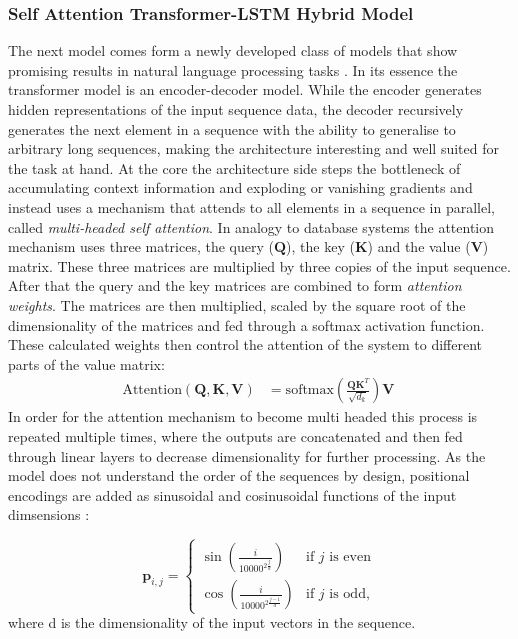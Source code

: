 \documentclass[12pt]{article}
\begin{document}
\subsubsection{Self Attention Transformer-LSTM Hybrid Model}
The next model comes form a newly developed class of models that show promising results in natural language processing tasks  \citep{vaswani2017attention}. In its essence the transformer model is an encoder-decoder model. While the encoder generates hidden representations of the input sequence data, the decoder recursively generates the next element in a sequence with the ability to generalise to arbitrary long sequences, making the architecture interesting and well suited for the task at hand. At the core the architecture side steps the bottleneck of accumulating context information and exploding or vanishing gradients and instead uses a mechanism that attends to all elements in a sequence in parallel, called \textit{multi-headed self attention}. In analogy to database systems the attention mechanism uses three matrices, the query ($\mathbf{Q}$), the key ($\mathbf{K}$) and the value ($\mathbf{V}$) matrix. These three matrices are multiplied by three copies of the input sequence. After that the query and the key matrices are combined to form \textit{attention weights}. The matrices are then multiplied, scaled by the square root of the dimensionality of the matrices and fed through a softmax activation function. These calculated weights then control the attention of the system to different parts of the value matrix:
\begin{equation}
\begin{aligned}
	\text{Attention}(\mathbf{Q}, \mathbf{K}, \mathbf{V}) &= \text{softmax}\left(\frac{\mathbf{Q}\mathbf{K}^T}{\sqrt{d_k}}\right)\mathbf{V} \
\end{aligned}
\end{equation}
In order for the attention mechanism to become multi headed this process is repeated multiple times, where the outputs are concatenated and then fed through linear layers to decrease dimensionality for further processing. As the model does not understand the order of the sequences by design, positional encodings are added as sinusoidal and cosinusoidal functions of the input dimsensions \citep{vaswani2017attention}:

\begin{equation}
	\mathbf{p}_{i,j} =
	\begin{cases}
		\sin\left(\frac{i}{10000^{2 \frac{j}{d}}}\right) & \text{if } j \text{ is even} \\
		\cos\left(\frac{i}{10000^{2 \frac{j-1}{d}}}\right) & \text{if } j \text{ is odd}, 
	\end{cases}
\end{equation}
where d is the dimensionality of the input vectors in the sequence.
\end{document}
